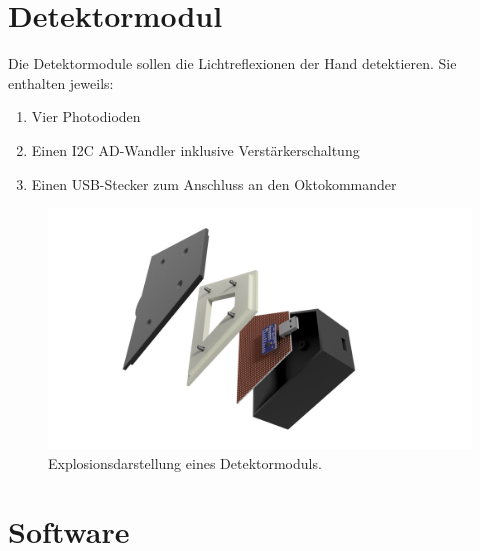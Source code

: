 \documentclass{sciposter}
\begin{document}
\begin{multicols}{3}

\section{Detektormodul}
\noindent
Die Detektormodule sollen die Lichtreflexionen der Hand detektieren. Sie enthalten jeweils:
\begin{enumerate}
	\item Vier Photodioden 
	\item Einen I2C AD-Wandler inklusive Verstärkerschaltung
	\item Einen USB-Stecker zum Anschluss an den Oktokommander
\end{enumerate}

\begin{figure}[h]
	\centering
	\includegraphics[scale=0.5]{../CAD_Bilder/Detektormodul/Detektormodul_raytraced.png}
	\caption{Explosionsdarstellung eines Detektormoduls.}
	\label{fig:Detektormodul}
\end{figure}


\section{Software}


\end{multicols}
\end{document}

